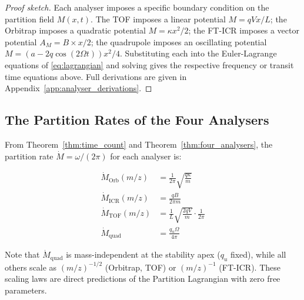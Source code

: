 \begin{proof}[Proof sketch]
Each analyser imposes a specific boundary condition on the partition field
$M(x,t)$. The TOF imposes a linear potential $M = qVx/L$; the Orbitrap imposes
a quadratic potential $M = \kappa x^2/2$; the FT-ICR imposes a vector potential
$A_M = B \times x/2$; the quadrupole imposes an oscillating potential
$M = (a - 2q\cos(2\Omega t))x^2/4$. Substituting each into the Euler-Lagrange
equations of \eqref{eq:lagrangian} and solving gives the respective frequency
or transit time equations above. Full derivations are given in
Appendix~\ref{app:analyser_derivations}.
\end{proof}

\subsection{The Partition Rates of the Four Analysers}
\label{subsec:partition_rates}

From Theorem~\ref{thm:time_count} and Theorem~\ref{thm:four_analysers}, the
partition rate $\dot{M} = \omega/(2\pi)$ for each analyser is:

\begin{align}
    \dot{M}_{\mathrm{Orb}}(m/z) &= \frac{1}{2\pi}\sqrt{\frac{q\kappa}{m}}
    \label{eq:mdot_orb} \\
    \dot{M}_{\mathrm{ICR}}(m/z) &= \frac{qB}{2\pi m}
    \label{eq:mdot_icr} \\
    \dot{M}_{\mathrm{TOF}}(m/z) &= \frac{1}{L}\sqrt{\frac{2qV}{m}} \cdot
    \frac{1}{2\pi}
    \label{eq:mdot_tof} \\
    \dot{M}_{\mathrm{quad}} &= \frac{q_u \Omega}{4\pi}
    \label{eq:mdot_quad}
\end{align}

Note that $\dot{M}_{\mathrm{quad}}$ is mass-independent at the stability apex
($q_u$ fixed), while all others scale as $(m/z)^{-1/2}$ (Orbitrap, TOF) or
$(m/z)^{-1}$ (FT-ICR). These scaling laws are direct predictions of the
Partition Lagrangian with zero free parameters.
